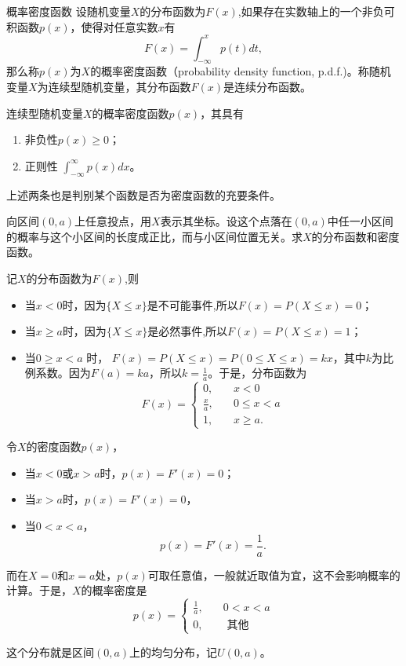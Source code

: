 \begin{definition}{概率密度函数}\label{def:pdf}
    设随机变量$X$的分布函数为$F(x)$,如果存在实数轴上的一个非负可积函数$p(x)$，使得对任意实数$x$有
$$F(x) = \int_{-\infty}^{x} p(t) d t,$$
那么称$p(x)$为$X$的概率密度函数（probability density function, p.d.f.)。称随机变量$X$为连续型随机变量，其分布函数$F(x)$是连续分布函数。
\end{definition}
\begin{property}
连续型随机变量$X$的概率密度函数$p(x)$，其具有
\begin{enumerate}
    \item 非负性\quad $p(x) \geqslant 0$；
    \item 正则性 \quad  $\int_{-\infty}^{\infty} p(x) d x$。
\end{enumerate}
\end{property}
\begin{remark}
上述两条也是判别某个函数是否为密度函数的充要条件。
\end{remark}
\begin{example}
向区间$(0,a)$上任意投点，用$X$表示其坐标。设这个点落在$(0,a)$中任一小区间的概率与这个小区间的长度成正比，而与小区间位置无关。求$X$的分布函数和密度函数。
\end{example}
\begin{solution}
记$X$的分布函数为$F(x)$,则
\begin{itemize}
\item 当$x<0$时，因为$\{X \leq x\}$是不可能事件,所以$F(x)=P( X \leq x)=0$；
\item 当$x \geq a$时，因为$\{X \leq x\}$是必然事件,所以$F(x)=P( X \leq x)=1$；
\item 当$0 \geq x <a $ 时， $F(x) =P(X \leq x)=P(0 \leq X \leq x) = k x$，其中$k$为比例系数。因为$F(a)=ka$，所以$k = \frac{1}{a}$。于是，分布函数为$$F(x)=\left\{\begin{aligned}
    0, &\quad  x<0 \\
\frac{x}{a}, & \quad 0 \leq x<a \\
1, &\quad  x \geq a.
\end{aligned}\right.
$$
\end{itemize}
令$X$的密度函数$p(x)$，
\begin{itemize}
    \item 当$x<0$或$x>a$时，$p(x)=F'(x)=0$；
    \item 当$x>a$时，$p(x)=F'(x)=0$，
    \item 当$0< x< a$，$$
    p(x) = F'(x) =  \frac{1}{a}.
    $$
\end{itemize}
而在$X=0$和$x=a$处，$p(x)$可取任意值，一般就近取值为宜，这不会影响概率的计算。于是，$X$的概率密度是
$$
p(x)= \left\{\begin{aligned}
\frac{1}{a}, &\quad  0<x<a \\
0, & \quad \text { 其他 }
\end{aligned}\right.
$$
\end{solution}
\begin{remark}
    这个分布就是区间$(0,a)$上的均匀分布，记$U(0, a)$。
\end{remark}

